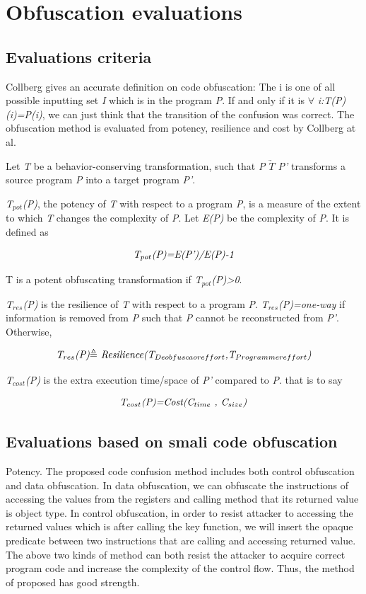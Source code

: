 \section{Obfuscation evaluations}
\subsection{Evaluations criteria}
Collberg\cite{16} gives an accurate definition on code obfuscation: The i is one of all possible inputting set \emph{I} which is in the program \emph{P}. If and only if it is $\forall$ \emph{i:T(P)(i)=P(i)}, we can just think that the transition of the confusion was correct. The obfuscation method is evaluated from potency, resilience and cost by Collberg at al.

Let \emph{T} be a behavior-conserving transformation, such that \emph{P $\underrightarrow{T}$ P'} transforms a source program \emph{P} into a target program \emph{P'}.

\emph{T$_{pot}$(P)}, the potency of \emph{T} with respect to a program \emph{P}, is a measure of the extent to which \emph{T} changes the complexity of \emph{P}. Let \emph{E(P)} be the complexity of \emph{P}.  It is defined as

 \begin{equation}\emph{T$_{pot}$(P)=E(P')/E(P)-1}\end{equation}

 \noindent T is a potent obfuscating transformation if \emph{T$_{pot}$(P)>0}.

\emph{T$_{res}$(P)} is the resilience of \emph{T} with respect to a program \emph{P}. \emph{T$_{res}$(P)=one-way} if information is removed from \emph{P} such that \emph{P} cannot be reconstructed from \emph{P'}. Otherwise,

 \begin{equation}\emph{T$_{res}$(P)$\triangleq$ Resilience(T$_{Deobfuscaor effort}$,T$_{Programmer effort}$)}\end{equation}

\emph{T$_{cost}$(P)} is the extra execution time/space of \emph{P'} compared to \emph{P}. that is to say

\begin{equation}\emph{T$_{cost}$(P)=Cost(C$_{time}$ , C$_{size}$)}\end{equation}

\subsection{Evaluations based on smali code obfuscation}
Potency. The proposed code confusion method includes both control obfuscation and data obfuscation. In data obfuscation, we can obfuscate the instructions of accessing the values from the registers and calling method that its returned value is object type. In control obfuscation, in order to resist attacker to accessing the returned values which is after calling the key function, we will insert the opaque predicate between two instructions that are calling and accessing returned value. The above two kinds of method can both resist the attacker to acquire correct program code and increase the complexity of the control flow. Thus, the method of proposed has good strength.


